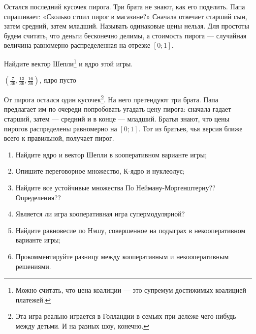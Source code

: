 \begin{problem}[Toetjes.]
\begin{source}
\cite{ferguson:tn}
\end{source}
Остался последний кусочек пирога. Три брата не знают, как его поделить. Папа спрашивает: «Сколько стоил пирог в магазине?» Сначала отвечает старший сын, затем средний, затем младший. Называть одинаковые цены нельзя. Для простоты будем считать, что деньги бесконечно делимы, а стоимость пирога — случайная величина равномерно распределенная на отрезке $[0;1]$.

Найдите вектор Шепли\footnote{Можно считать, что цена коалиции — это супремум достижимых коалицией платежей.} и ядро этой игры.

\begin{sol}
$\left(\frac{7}{36},\frac{13}{36},\frac{16}{36}\right)$, ядро пусто
\end{sol}
\end{problem}



\begin{problem}


От пирога остался один кусочек\footnote{Эта игра реально играется в Голландии в семьях при дележе чего-нибудь между детьми. И на разных шоу, конечно.}. На него претендуют три брата. Папа предлагает им по очереди попробовать угадать цену пирога: сначала гадает старший, затем — средний и в конце — младший. Братья знают, что цены пирогов распределены равномерно на $[0;1]$. Тот из братьев, чья версия ближе всего к правильной, получает пирог.
\begin{enumerate}
\item Найдите ядро и вектор Шепли в кооперативном варианте игры;

\item Опишите переговорное множество, К-ядро и нуклеолус;

\item Найдите все устойчивые множества {\red По Нейману-Моргенштерну?? Определения??}


\item Является ли игра кооперативная игра супермодулярной?

\item Найдите равновесие по Нэшу, совершенное на подыграх в некооперативном варианте игры;

\item Прокомментируйте разницу между кооперативным и некооперативным решениями.
\end{enumerate}



\begin{sol}

\end{sol}
\end{problem}




